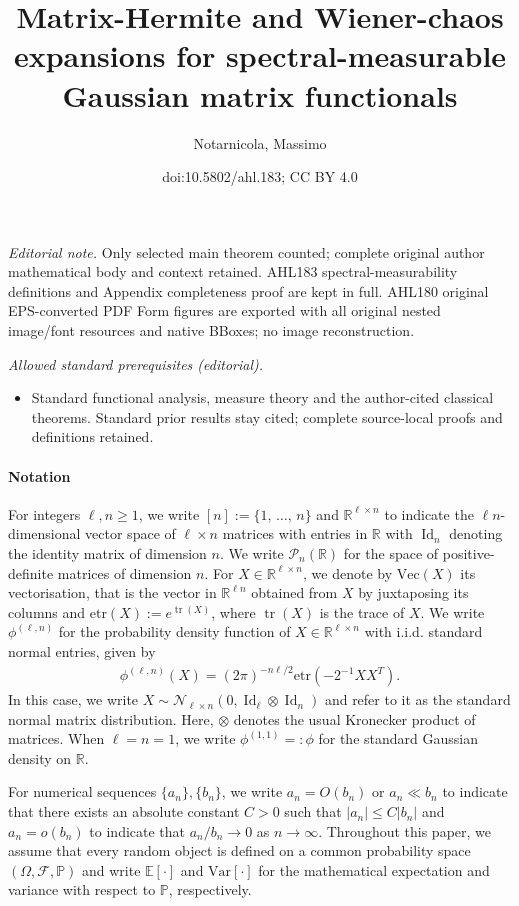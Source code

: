 \documentclass[10pt]{amsart}
\title{Matrix-Hermite and Wiener-chaos expansions for spectral-measurable Gaussian matrix functionals}
\author{Notarnicola, Massimo}
\date{doi:10.5802/ahl.183; CC BY 4.0}
\theoremstyle{definition}\newtheorem{defi}[theo]{Definition}\newtheorem{rema}[theo]{Remark}\newtheorem{exam}[theo]{Example}\newtheorem{exem}[theo]{Example}\newtheorem{nota}[theo]{Notation}
\DeclareMathOperator{\Id}{Id}
\DeclareMathOperator{\Tr}{tr}
\newcommand{\scN}{\mathscr{N}}
\renewcommand{\Vec}{\mathrm{Vec}}
\newcommand{\clP}{\mathcal{P}}
\newcommand{\clF}{\mathcal{F}}
\newcommand{\R}{\mathbb{R}}
\newcommand{\Prob}{\mathbb{P}}
\newcommand{\E}[1]{\mathbb{E}\left[#1\right]}
\newcommand{\V}[1]{\mathrm{Var}{\left[#1\right]}}
\newcommand{\etr}[1]{\mathrm{etr}\left(#1\right)}
\begin{document}
\maketitle
\noindent\textit{Editorial note.} Only selected main theorem counted; complete original author mathematical body and context retained. AHL183 spectral-measurability definitions and Appendix completeness proof are kept in full. AHL180 original EPS-converted PDF Form figures are exported with all original nested image/font resources and native BBoxes; no image reconstruction.\par\medskip
\noindent\textit{Allowed standard prerequisites (editorial).}\begin{itemize}
\item Standard functional analysis, measure theory and the author-cited classical theorems. Standard prior results stay cited; complete source-local proofs and definitions retained.
\end{itemize}\medskip



\paragraph{Notation}
For integers $\ell,n\geq 1$, we write $[n]:=\{1,\,\ldots,\,n\}$ and $\R^{\ell \times n}$ to indicate the $\ell n$-dimensional vector space of $\ell\times n$ matrices with entries in $\R$ with $\Id_n$ denoting the identity matrix of dimension $n$. We write $\clP_{n}(\R)$ for the space of positive-definite matrices of dimension $n$. For $X \in \R^{\ell \times n}$, we denote by $\Vec(X)$ its vectorisation, that is the vector in $\R^{\ell n}$ obtained from $X$ by juxtaposing its columns and $\etr{X}:= e^{\Tr(X)}$, where $\Tr(X)$ is the trace of $X$. We write $\phi^{(\ell,n)}$ for the probability density function of $X \in \R^{\ell \times n}$ with i.i.d. standard normal entries, given by
\begin{gather*}
\phi^{(\ell,n)}(X) = (2\pi)^{-n\ell/2} \etr{-2^{-1}XX^T }.
\end{gather*}
In this case, we write $X \sim \scN_{\ell \times n}(0, \Id_{\ell}\otimes \Id_n)$ and refer to it as the standard normal matrix distribution. Here, $\otimes$ denotes the usual Kronecker product of matrices. When $\ell=n=1$, we write $\phi^{(1,1)}=:\phi$ for the standard Gaussian density on $\R$.

For numerical sequences $\{a_n\},\{b_n\}$, we write $a_n=O(b_n)$ or $a_n \ll b_n$ to indicate that there exists an absolute constant $C>0$ such that $|a_n| \leq C|b_n|$ and $a_n=o(b_n)$ to indicate that $a_n/b_n\to0$ as $n \to \infty$. Throughout this paper, we assume that every random object is defined on a common probability space $(\Omega,\clF,\Prob)$ and write $\E{\cdot}$ and $\V{\cdot}$ for the mathematical expectation and variance with respect to $\Prob$, respectively.
\end{document}
